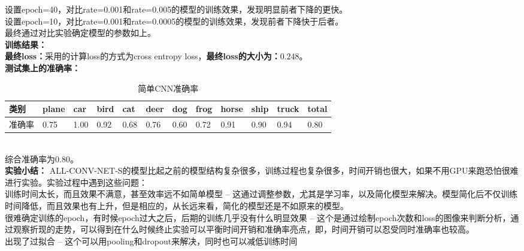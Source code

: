 \documentclass[a4paper,UTF8]{article}
\numberwithin{equation}{section}
\begin{document}
\begin{enumerate}
设置epoch=40，对比rate=0.001和rate=0.005的模型的训练效果，发现明显前者下降的更快。\\
设置epoch=10，对比rate=0.001和rate=0.0005的模型的训练效果，发现前者下降快于后者。\\
最终通过对比实验确定模型的参数如上。\\
\textbf{训练结果：}\\
\textbf{最终loss：}采用的计算loss的方式为cross entropy loss，\textbf{最终loss的大小为：$0.248$}。\\
\textbf{测试集上的准确率：}
\begin{table}[h]
	\centering
	\caption{简单CNN准确率}
	\label{ac1}
	\begin{tabular}{|l|l|l|l|l|l|l|l|l|l|l|l|}
		\hline
		类别	& plane & car & bird & cat & deer & dog & frog & horse & ship & truck & total \\ \hline
		准确率	& 0.75 & 1.00 & 0.92 & 0.68 & 0.76 & 0.60 & 0.72 & 0.91 & 0.90 & 0.94 & 0.80 \\ \hline
	\end{tabular}
\end{table}\\
综合准确率为$0.80$。\\
\textbf{实验小结：}
ALL-CONV-NET-S的模型比起之前的模型结构复杂很多，训练过程也复杂很多，时间开销也很大，如果不用GPU来跑恐怕很难进行实验。实验过程中遇到这些问题：\\
训练时间太长，而且效果不满意，甚至效率远不如简单模型 -- 这通过调整参数，尤其是学习率，以及简化模型来解决。模型简化后不仅训练时间降低，而且效果也有上升，但是相应的，从长远来看，简化的模型还是不如原来的模型。\\
很难确定训练的epoch，有时候epoch过大之后，后期的训练几乎没有什么明显效果 -- 这个是通过绘制epoch次数和loss的图像来判断分析，通过观察折现的走势，可以得到在什么时候终止实验可以平衡时间开销和准确率亮点，即，时间开销可以忍受同时准确率也较高。\\
出现了过拟合 -- 这个可以用pooling和dropout来解决，同时也可以减低训练时间\\


\end{enumerate}
\end{document}

